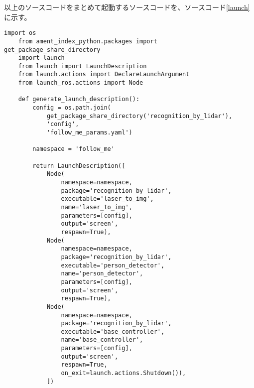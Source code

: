 以上のソースコードをまとめて起動するソースコードを、ソースコード\ref{launch}に示す。
\begin{lstlisting}[caption=follow\_me.launch.py, label=launch]
    import os
    from ament_index_python.packages import get_package_share_directory
    import launch
    from launch import LaunchDescription
    from launch.actions import DeclareLaunchArgument
    from launch_ros.actions import Node
    
    def generate_launch_description():
        config = os.path.join(
            get_package_share_directory('recognition_by_lidar'),
            'config',
            'follow_me_params.yaml')
    
        namespace = 'follow_me'
    
        return LaunchDescription([
            Node(
                namespace=namespace,
                package='recognition_by_lidar',
                executable='laser_to_img',
                name='laser_to_img',
                parameters=[config],
                output='screen',
                respawn=True),
            Node(
                namespace=namespace,
                package='recognition_by_lidar',
                executable='person_detector',
                name='person_detector',
                parameters=[config],
                output='screen',
                respawn=True),
            Node(
                namespace=namespace,
                package='recognition_by_lidar',
                executable='base_controller',
                name='base_controller',
                parameters=[config],
                output='screen',
                respawn=True,
                on_exit=launch.actions.Shutdown()),
            ])
\end{lstlisting}